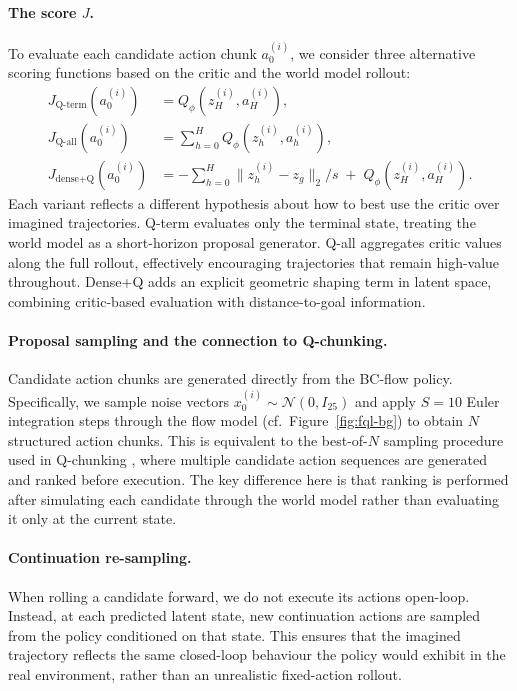 \paragraph{The score $J$.}
To evaluate each candidate action chunk $a_0^{(i)}$, we consider three alternative scoring functions based on the critic and the world model rollout:
\begin{align}
    J_{\text{Q-term}}(a_0^{(i)}) &= Q_\phi(z_H^{(i)}, a_H^{(i)}), \\
    J_{\text{Q-all}}(a_0^{(i)})  &= \sum_{h=0}^{H} Q_\phi(z_h^{(i)}, a_h^{(i)}), \\
    J_{\text{dense+Q}}(a_0^{(i)}) &= -\sum_{h=0}^{H} \|z_h^{(i)} - z_g\|_2 / s
                                  \;+\; Q_\phi(z_H^{(i)}, a_H^{(i)}).
\end{align}
Each variant reflects a different hypothesis about how to best use the critic over imagined trajectories. Q-term evaluates only the terminal state, treating the world model as a short-horizon proposal generator. Q-all aggregates critic values along the full rollout, effectively encouraging trajectories that remain high-value throughout. Dense+Q adds an explicit geometric shaping term in latent space, combining critic-based evaluation with distance-to-goal information.

\paragraph{Proposal sampling and the connection to Q-chunking.}
Candidate action chunks are generated directly from the BC-flow policy. Specifically, we sample noise vectors $x_0^{(i)} \sim \mathcal{N}(0, I_{25})$ and apply $S = 10$ Euler integration steps through the flow model (cf.\ Figure~\ref{fig:fql-bg}) to obtain $N$ structured action chunks. This is equivalent to the best-of-$N$ sampling procedure used in Q-chunking \cite{li2026reinforcementlearningactionchunking}, where multiple candidate action sequences are generated and ranked before execution. The key difference here is that ranking is performed after simulating each candidate through the world model rather than evaluating it only at the current state.

\paragraph{Continuation re-sampling.}
When rolling a candidate forward, we do not execute its actions open-loop. Instead, at each predicted latent state, new continuation actions are sampled from the policy conditioned on that state. This ensures that the imagined trajectory reflects the same closed-loop behaviour the policy would exhibit in the real environment, rather than an unrealistic fixed-action rollout.

